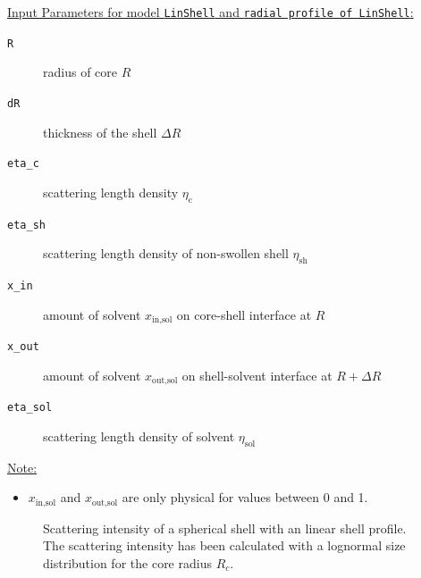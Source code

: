 \underline{Input Parameters for model \texttt{LinShell} and \texttt{radial profile of LinShell}:}\\
\begin{description}
\item[\texttt{R}] radius of core $R$
\item[\texttt{dR}] thickness of the shell $\Delta R$
\item[\texttt{eta\_c}] scattering length density $\eta_\text{c}$
\item[\texttt{eta\_sh}] scattering length density of non-swollen shell $\eta_\text{sh}$
\item[\texttt{x\_in}] amount of solvent $x_\text{in,sol}$ on core-shell interface at $R$
\item[\texttt{x\_out}] amount of solvent $x_\text{out,sol}$ on shell-solvent interface at $R+\Delta R$
\item[\texttt{eta\_sol}] scattering length density of solvent $\eta_\text{sol}$
\end{description}

\noindent\underline{Note:}
\begin{itemize}
\item $x_\text{in,sol}$ and $x_\text{out,sol}$ are only physical for values between 0 and 1.
\end{itemize}


\begin{figure}[htb]
\captionsetup[subfigure]{position=b}
\centering
{}
\hfill
{}
\caption{Scattering intensity of a spherical shell with an linear shell profile. The scattering intensity has been calculated
with a lognormal size distribution for the core radius $R_c$.}
\label{fig:I_LinShell}
\end{figure}

